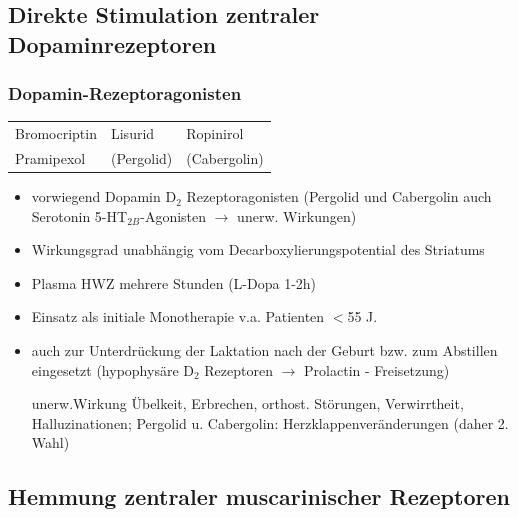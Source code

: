 \documentclass[10pt,a4paper]{report}
\begin{document}
\subsection{Direkte Stimulation zentraler Dopaminrezeptoren} %
\label{sub:direkte_stimulation_zentraler_dopaminrezeptoren}
\subsubsection{Dopamin-Rezeptoragonisten} %
\label{ssub:dopamin_rezeptoragonisten}
\begin{tabularx}{\textwidth}{XXX}
Bromocriptin&Lisurid&Ropinirol\\
Pramipexol&(Pergolid)&(Cabergolin)\\
\end{tabularx}
\begin{itemize}
	\item 	vorwiegend Dopamin D$_2$ Rezeptoragonisten (Pergolid und Cabergolin auch Serotonin 5-HT$_{2B}$-Agonisten $\rightarrow$ unerw. Wirkungen)
	\item Wirkungsgrad unabhängig vom Decarboxylierungspotential des Striatums
	\item Plasma HWZ mehrere Stunden (L-Dopa 1-2h)
	\item Einsatz als initiale Monotherapie v.a. Patienten $<$55 J.  
	\item auch zur Unterdrückung der Laktation nach der Geburt bzw. zum Abstillen eingesetzt (hypophysäre D$_2$ Rezeptoren $\rightarrow$ Prolactin - Freisetzung)
	\item[unerw.Wirkung] Übelkeit, Erbrechen, orthost. Störungen, Verwirrtheit, Halluzinationen; Pergolid u. Cabergolin: Herzklappenveränderungen (daher 2. Wahl)
\end{itemize}
\subsection{Hemmung zentraler muscarinischer Rezeptoren} %
\label{sub:hemmung_zentraler_muscarinischer_rezeptoren}
\end{document}
